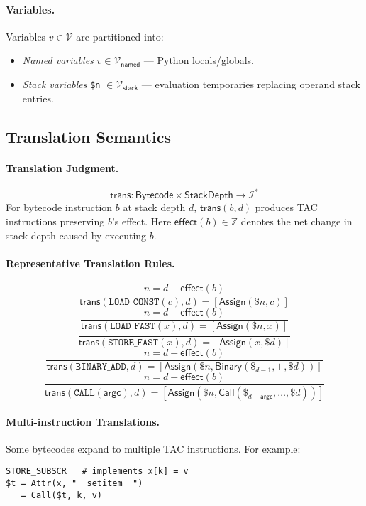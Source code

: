 \paragraph{Variables.} Variables $v \in \mathcal{V}$ are partitioned into:
\begin{itemize}
\item \emph{Named variables} $v \in \mathcal{V}_{\mathsf{named}}$ — Python locals/globals.
\item \emph{Stack variables} \texttt{\$n} $\in \mathcal{V}_{\mathsf{stack}}$ — evaluation temporaries replacing operand stack entries.
\end{itemize}

\subsection{Translation Semantics}

\paragraph{Translation Judgment.}
\[
\mathsf{trans} : \mathsf{Bytecode} \times \mathsf{StackDepth} \to \mathcal{I}^*
\]
For bytecode instruction $b$ at stack depth $d$, $\mathsf{trans}(b, d)$ produces TAC instructions preserving $b$’s effect. Here $\mathsf{effect}(b) \in \mathbb{Z}$ denotes the net change in stack depth caused by executing $b$.

\paragraph{Representative Translation Rules.}
\[
\frac{n = d + \mathsf{effect}(b)}{\mathsf{trans}(\mathtt{LOAD\_CONST}(c), d) = [\mathsf{Assign}(\texttt{\$}n, c)]}
\]
\[
\frac{n = d + \mathsf{effect}(b)}{\mathsf{trans}(\mathtt{LOAD\_FAST}(x), d) = [\mathsf{Assign}(\texttt{\$}n, x)]}
\]
\[
\frac{}{\mathsf{trans}(\mathtt{STORE\_FAST}(x), d) = [\mathsf{Assign}(x, \texttt{\$}d)]}
\]
\[
\frac{n = d + \mathsf{effect}(b)}{\mathsf{trans}(\mathtt{BINARY\_ADD}, d) =
[\mathsf{Assign}(\texttt{\$}n, \mathsf{Binary}(\texttt{\$}_{d-1}, +, \texttt{\$}d))]}
\]
\[
\frac{n = d + \mathsf{effect}(b)}{\mathsf{trans}(\mathtt{CALL}(\mathsf{argc}), d) =
[\mathsf{Assign}(\texttt{\$}n, \mathsf{Call}(\texttt{\$}_{d-\mathsf{argc}}, \ldots, \texttt{\$}d))]}
\]

\paragraph{Multi-instruction Translations.}
Some bytecodes expand to multiple TAC instructions. For example:
\begin{verbatim}
STORE_SUBSCR   # implements x[k] = v
$t = Attr(x, "__setitem__")
_  = Call($t, k, v)
\end{verbatim}

